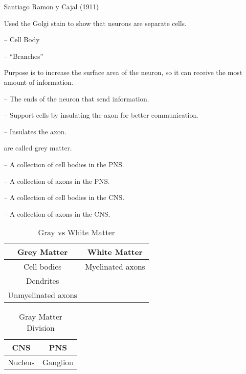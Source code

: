 \begin{coloredlist}
    \item Santiago Ramon y Cajal (1911)
    \begin{coloredlist}
        \item Used the Golgi stain to show that neurons are separate cells.
    \end{coloredlist}
    \item {} -- Cell Body
    \item {} -- ``Branches''
    \begin{coloredlist}
        \item Purpose is to increase the surface area of the neuron, so it can receive the most amount of information.
    \end{coloredlist}
    \item {} -- The ends of the neuron that send information.
    \item {} -- Support cells by insulating the axon for better communication.
    \item {} -- Insulates the axon.
    \item {} are called grey matter.
    \item {} -- A collection of cell bodies in the PNS.
    \item {} -- A collection of axons in the PNS.
    \item {} -- A collection of cell bodies in the CNS.
    \item {} -- A collection of axons in the CNS.
\end{coloredlist}

\begin{table}[htbp]
    \centering
    \begin{tabular}{cc}
        \toprule
        \textbf{Grey Matter} & \textbf{White Matter} \\ \midrule
        Cell bodies          & Myelinated axons      \\
        Dendrites            &                       \\
        Unmyelinated axons   &                       \\
        \bottomrule
    \end{tabular}
    \caption{Gray vs White Matter}\label{tab:}
\end{table}

\begin{table}[htbp]
    \centering
    \begin{tabular}{cc}
        \toprule
        \textbf{CNS} & \textbf{PNS} \\ \midrule
        Nucleus      & Ganglion     \\
        \bottomrule
    \end{tabular}
    \caption{Gray Matter Division}\label{tab:}
\end{table}

